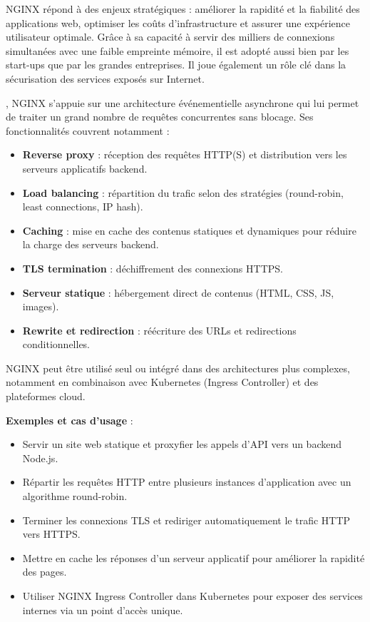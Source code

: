  NGINX répond à des enjeux stratégiques  : améliorer la rapidité et la fiabilité des applications web, optimiser les coûts d’infrastructure et assurer une expérience utilisateur optimale. Grâce à sa capacité à servir des milliers de connexions simultanées avec une faible empreinte mémoire, il est adopté aussi bien par les start-ups que par les grandes entreprises. Il joue également un rôle clé dans la sécurisation des services exposés sur Internet.

, NGINX s’appuie sur une architecture événementielle asynchrone qui lui permet de traiter un grand nombre de requêtes concurrentes sans blocage. Ses fonctionnalités couvrent notamment  :
\begin{itemize}
	\item \textbf{Reverse proxy}  : réception des requêtes HTTP(S) et distribution vers les serveurs applicatifs backend.
	\item \textbf{Load balancing}  : répartition du trafic selon des stratégies (round-robin, least connections, IP hash).
	\item \textbf{Caching}  : mise en cache des contenus statiques et dynamiques pour réduire la charge des serveurs backend.
	\item \textbf{TLS termination}  : déchiffrement des connexions HTTPS.
	\item \textbf{Serveur statique}  : hébergement direct de contenus (HTML, CSS, JS, images).
	\item \textbf{Rewrite et redirection}  : réécriture des URLs et redirections conditionnelles.
\end{itemize}

NGINX peut être utilisé seul ou intégré dans des architectures plus complexes, notamment en combinaison avec Kubernetes (Ingress Controller) et des plateformes cloud.

\textbf{Exemples et cas d’usage} :
\begin{itemize}
	\item Servir un site web statique et proxyfier les appels d’API vers un backend Node.js.
	\item Répartir les requêtes HTTP entre plusieurs instances d’application avec un algorithme round-robin.
	\item Terminer les connexions TLS et rediriger automatiquement le trafic HTTP vers HTTPS.
	\item Mettre en cache les réponses d’un serveur applicatif pour améliorer la rapidité des pages.
	\item Utiliser NGINX Ingress Controller dans Kubernetes pour exposer des services internes via un point d’accès unique.
\end{itemize}

